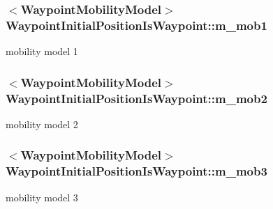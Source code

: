 \subsubsection[{\texorpdfstring{m\+\_\+mob1}{m_mob1}}]{$<${\bf Waypoint\+Mobility\+Model}$>$ Waypoint\+Initial\+Position\+Is\+Waypoint\+::m\+\_\+mob1\hspace{0.3cm}{\ttfamily [private]}}\hypertarget{classWaypointInitialPositionIsWaypoint_a9b93ba0b150329a715f03d1e9d17c38f}{}\label{classWaypointInitialPositionIsWaypoint_a9b93ba0b150329a715f03d1e9d17c38f}


mobility model 1 

\subsubsection[{\texorpdfstring{m\+\_\+mob2}{m_mob2}}]{$<${\bf Waypoint\+Mobility\+Model}$>$ Waypoint\+Initial\+Position\+Is\+Waypoint\+::m\+\_\+mob2\hspace{0.3cm}{\ttfamily [private]}}\hypertarget{classWaypointInitialPositionIsWaypoint_a7900aaed6cf7a4022808b6905d6d71c1}{}\label{classWaypointInitialPositionIsWaypoint_a7900aaed6cf7a4022808b6905d6d71c1}


mobility model 2 

\subsubsection[{\texorpdfstring{m\+\_\+mob3}{m_mob3}}]{$<${\bf Waypoint\+Mobility\+Model}$>$ Waypoint\+Initial\+Position\+Is\+Waypoint\+::m\+\_\+mob3\hspace{0.3cm}{\ttfamily [private]}}\hypertarget{classWaypointInitialPositionIsWaypoint_ae5d635a7eddf81f70c712ad7a20de402}{}\label{classWaypointInitialPositionIsWaypoint_ae5d635a7eddf81f70c712ad7a20de402}


mobility model 3 

